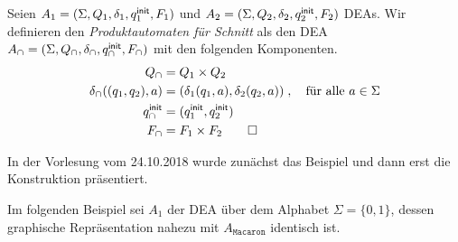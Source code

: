 \begin{Def}\label{def:2.Produktautomat}
Seien $A_1=(\Sigma, Q_1,\delta_1,q^\mathsf{init}_1,F_1)$ und $A_2=(\Sigma, Q_2,\delta_2,q^\mathsf{init}_2,F_2)$ \ac{DEA}s.
Wir definieren den \emph{Produktautomaten für Schnitt} als den \ac{DEA} $A_\cap=(\Sigma, Q_\cap,\delta_\cap,q^\mathsf{init}_\cap,F_\cap)$ mit den folgenden Komponenten.
		\begin{align*}
			Q_\cap &= Q_1\times Q_2\\
			\delta_\cap((q_1,q_2),a) &= (\delta_1(q_1,a),\delta_2(q_2,a))\;, \quad \text{für alle } a\in\Sigma\\
			q^\mathsf{init}_\cap &= (q^\mathsf{init}_1,q^\mathsf{init}_2)\\
			F_\cap &= F_1\times F_2\qedhere
		\end{align*}
\end{Def}

{\color{green!60!black}
\begin{Bemerkung}
In der Vorlesung vom 24.10.2018 wurde zunächst das Beispiel und dann erst die Konstruktion präsentiert.
\end{Bemerkung}
}

Im folgenden Beispiel sei $A_1$ der \ac{DEA} über dem Alphabet $\Sigma=\{0,1\}$, dessen graphische Repräsentation nahezu mit $A_{\mathtt{Macaron}}$ identisch ist.

\begin{center}
\end{center}


